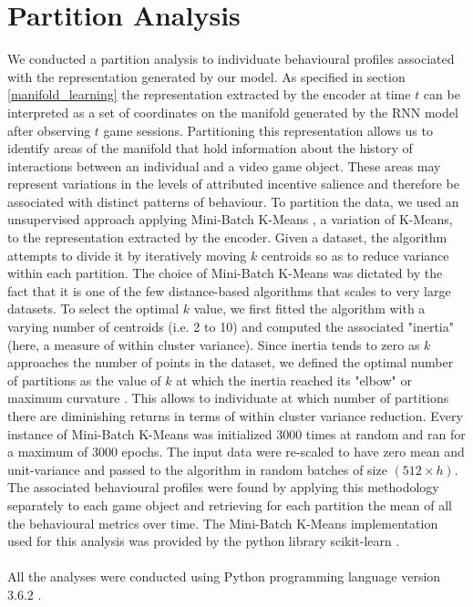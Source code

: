 \section{Partition Analysis}
\label{partition_analysese}
We conducted a partition analysis to individuate behavioural profiles associated with the representation generated by our model. As specified in section \ref{manifold_learning} the representation extracted by the encoder at time $t$ can be interpreted as a set of coordinates on the manifold generated by the RNN model after observing $t$ game sessions. Partitioning this representation allows us to identify areas of the manifold that hold information about the history of interactions between an individual and a video game object. These areas may represent variations in the levels of attributed incentive salience and therefore be associated with distinct patterns of behaviour. To partition the data, we used an unsupervised approach applying Mini-Batch K-Means \cite{sculley2010web}, a variation of K-Means, to the representation extracted by the encoder. Given a dataset, the algorithm attempts to divide it by iteratively moving $k$ centroids so as to reduce variance within each partition. The choice of Mini-Batch K-Means was dictated by the fact that it is one of the few distance-based algorithms that scales to very large datasets. To select the optimal $k$ value, we first fitted the algorithm with a varying number of centroids (i.e. 2 to 10) and computed the associated "inertia" (here, a measure of within cluster variance). Since inertia tends to zero as $k$ approaches the number of points in the dataset, we defined the optimal number of partitions as the value of $k$ at which the inertia reached its "elbow" or maximum curvature \cite{satopaa2011finding}. This allows to individuate at which number of partitions there are diminishing returns in terms of within cluster variance reduction. Every instance of Mini-Batch K-Means was initialized 3000 times at random and ran for a maximum of 3000 epochs. The input data were re-scaled to have zero mean and unit-variance and passed to the algorithm in random batches of size $(512 \times h)$. The associated behavioural profiles were found by applying this methodology separately to each game object and retrieving for each partition the mean of all the behavioural metrics over time. The Mini-Batch K-Means implementation used for this analysis was provided by the python library scikit-learn \cite{scikit-learn}. \\
\\
All the analyses were conducted using Python programming language version 3.6.2 \cite{10.5555/1593511}.

